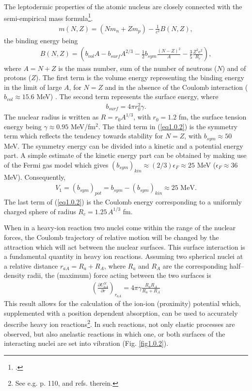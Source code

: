 The leptodermic properties of the atomic nucleus are closely connected with the semi-empirical mass formula\footnote{\cite{Weizsacker:35}.}.
\begin{align}
m(N,Z)=(Nm_n+Zm_p)-\frac{1}{c^2}B(N,Z),
\end{align}
the binding energy being
\begin{align}\label{eq1.0.2}
B(N,Z)=\left(b_{vol}A-b_{surf}A^{2/3}-\frac{1}{2} b_{sym}\frac{(N-Z)^2}{A}-\frac{3}{5}\frac{Z^2e^2}{R_c}\right),
\end{align}
where $A=N+Z$ is the mass number, sum of the number of neutrons ($N$) and of protons ($Z$).
The first term is the  volume energy representing the binding energy in the limit of large $A$, for $N=Z$ and in the absence of the Coulomb interaction ($b_{vol}\approx15.6$ MeV) . The second term represents the surface energy, where
\begin{align}\label{eq1.0.3}
b_{surf}=4\pi r_0^2\gamma.
\end{align}
The nuclear radius is written as $R=r_0A^{1/3}$, with $r_0=1.2$ fm, the surface tension energy being $\gamma\approx 0.95$ MeV/fm$^2$. 
The third term in (\ref{eq1.0.2}) is the symmetry term which reflects the tendency towards stability for $N=Z$, with $b_{sym}\approx50$ MeV. The symmetry energy can be divided into a kinetic and a potential energy part. A simple estimate of the kinetic energy part can be obtained by making use of the Fermi gas model which gives $(b_{sym})_{kin}\approx(2/3)\epsilon_F\approx25$ MeV ($\epsilon_F\approx 36$ MeV). Consequently,
\begin{align}\label{eq1.0.4bis}
V_1=(b_{sym})_{pot}=b_{sym}-(b_{sym})_{kin}\approx 25\text{ MeV}.
\end{align}
The last term of (\ref{eq1.0.2}) is the Coulomb energy corresponding to a uniformly charged sphere of radius $R_c=1.25\,A^{1/3}$ fm.


When in a heavy-ion reaction  two nuclei come within the range of the nuclear forces, the Coulomb  trajectory of relative motion will be changed by the attraction which will act between the nuclear surfaces. This surface interaction is a fundamental quantity in  heavy ion reactions. Assuming two spherical nuclei at a relative distance $r_{aA}=R_a+R_A$, where $R_a$ and $R_A$ are the corresponding half--density radii, the (maximum) force acting between the two surfaces is
\begin{align}\label{eq1.0.4}
\left(\frac{\partial U_{aA}^N}{\partial r}\right)_{r_{aA}}=4\pi \gamma\frac{R_aR_A}{R_a+R_A}
\end{align}
This result allows for the calculation of the ion-ion (proximity) potential which, supplemented with a position dependent absorption, can be used to accurately describe heavy ion reactions\footnote{See e.g. \cite{Broglia:04a} p. 110, and refs. therein.}.
In such reactions, not only elastic processes are observed, but also anelastic reactions in which one, or both  surfaces of the interacting nuclei are set into vibration (Fig. \ref{fig1.0.2}).


